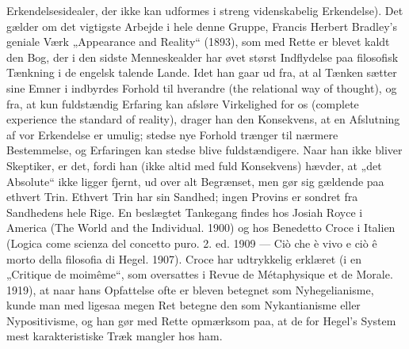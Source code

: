 \documentclass[12pt,a4paper,openany]{book}
\newcommand{\opage}[1]{\marginnote{\footnotesize\textit{[#1]}}}
\begin{document}
Erkendelsesidealer, der ikke kan udformes i streng videnskabelig
Erkendelse). Det gælder om det vigtigste Arbejde i hele denne
Gruppe, Francis Herbert Bradley’s geniale Værk „Appearance and
Reality“ (1893), som med Rette er blevet kaldt den Bog, der i den
sidste Menneskealder har øvet størst Indflydelse paa filosofisk Tænkning
i de engelsk talende Lande. Idet han gaar ud fra, at al Tænken
sætter sine Emner i indbyrdes Forhold til hverandre (the relational
way of thought), og fra, at kun fuldstændig Erfaring kan afsløre
Virkelighed for os (complete experience the standard of reality), drager
han den Konsekvens, at en Afslutning af vor Erkendelse er umulig;
stedse nye Forhold trænger til nærmere Bestemmelse, og Erfaringen
kan stedse blive fuldstændigere. Naar han ikke bliver Skeptiker,
er det, fordi han (ikke altid med fuld Konsekvens) hævder,
at „det Absolute“ ikke ligger fjernt, ud over alt Begrænset, men gør
sig gældende paa ethvert Trin. Ethvert Trin har sin Sandhed; ingen
Provins er sondret fra Sandhedens hele Rige. En beslægtet Tankegang
findes hos Josiah Royce i America (The World and the Individual.
1900) og hos Benedetto Croce i Italien (Logica come scienza
del concetto puro. 2. ed. 1909 --- Ciò che è vivo e ciò ê morto
della filosofia di Hegel. 1907). Croce har udtrykkelig erklæret (i en
„Critique de moimême“, som oversattes i Revue de Métaphysique et
de Morale. 1919), at naar hans Opfattelse ofte er bleven betegnet
\opage{79}som Nyhegelianisme, kunde man med ligesaa megen Ret betegne den
som Nykantianisme eller Nypositivisme, og han gør med Rette opmærksom
paa, at de for Hegel’s System mest karakteristiske Træk
mangler hos ham.
\end{document}

